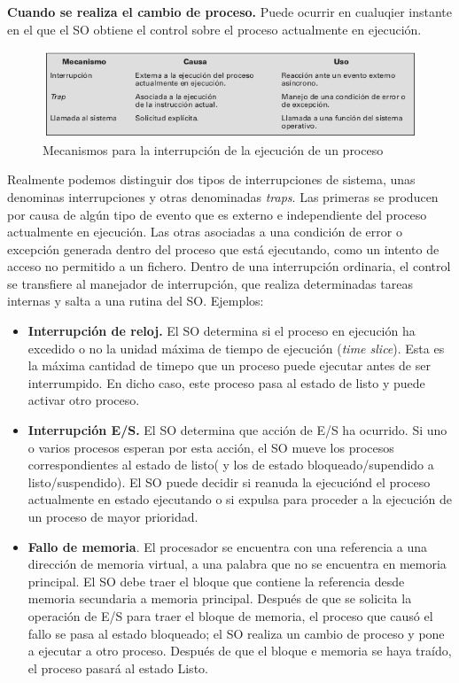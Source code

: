 \documentclass{article}
\begin{document}
				\textbf{Cuando se realiza el cambio de proceso.}     Puede ocurrir en cualuqier instante en el que el SO obtiene el control sobre el proceso actualmente en ejecución. \\
				
				\begin{figure}
				\caption{Mecanismos para la interrupción de la ejecución de un proceso}
				\label{figura2.15:interrupcion proceso}
				\centering
				\includegraphics[width=1\textwidth, scale=1]{tema_2_figura15.png}
				\end{figure}
				
				Realmente podemos distinguir dos tipos de interrupciones de sistema, unas denominas interrupciones y otras denominadas \textit{traps}. Las primeras se producen por causa de algún tipo de evento que es externo e independiente del proceso actualmente en ejecución. Las otras asociadas a una condición de error o excepción generada dentro del proceso que está ejecutando, como un intento de acceso no permitido a un fichero. Dentro de una interrupción ordinaria, el control se transfiere al manejador de interrupción, que realiza determinadas tareas internas y salta a una rutina del SO. Ejemplos:
				\begin{itemize}
				\item \textbf{Interrupción de reloj.} El SO determina si el proceso en ejecución ha excedido o no la unidad máxima de tiempo de ejecución (\textit{time slice}). Esta es la máxima cantidad de timepo que un proceso puede ejecutar antes de ser interrumpido. En dicho caso, este proceso pasa al estado de listo y puede activar otro proceso.
				\item \textbf{Interrupción E/S.} El SO determina que acción de E/S ha ocurrido. Si uno o varios procesos esperan por esta acción, el SO mueve los procesos correspondientes al estado de listo( y los de estado bloqueado/supendido a listo/suspendido). El SO puede decidir si reanuda la ejecuciónd el proceso actualmente en estado ejecutando o si expulsa para proceder a la ejecución de un proceso de mayor prioridad.
				\item \textbf{Fallo de memoria}. El procesador se encuentra con una referencia a una dirección de memoria virtual, a una palabra que no se encuentra en memoria principal. El SO debe traer el bloque que contiene la referencia desde memoria secundaria a memoria principal. Después de que se solicita la operación de E/S para traer el bloque de memoria, el proceso que causó el fallo se pasa al estado bloqueado; el SO realiza un cambio de proceso y pone a ejecutar a otro proceso. Después de que el bloque e memoria se haya traído, el proceso pasará al estado Listo.
				\end{itemize}
				
\end{document}
